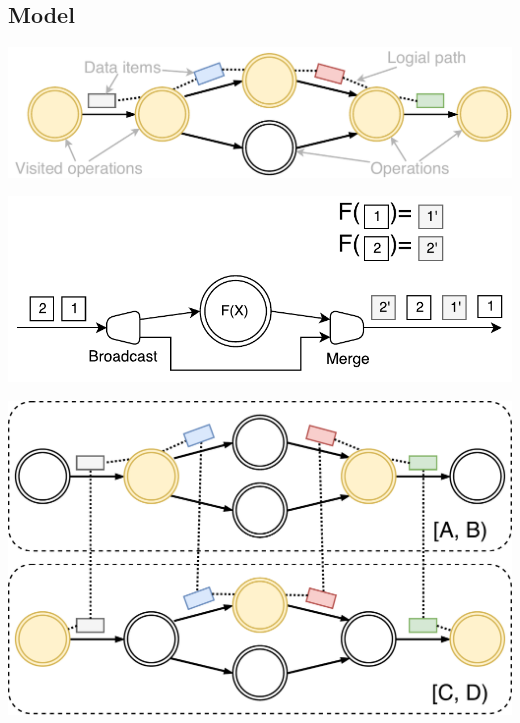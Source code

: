 \documentclass[a0,landscape]{a0poster}
\begin{document}
\begin{multicols*}{3}
\section{Model}

\begin{minipage}{\linewidth}
  \includegraphics[width=\linewidth]{pics/logical-graph}
  \label{logical-graph}
\end{minipage}

\begin{minipage}{\linewidth}
  \includegraphics[width=\linewidth]{pics/ordering}
  \label{ordering}
\end{minipage}

\begin{minipage}{\linewidth}
  \includegraphics[width=\linewidth]{pics/physical-graph}
  \label{physical-graph}
\end{minipage}


\end{multicols*}
\end{document}
